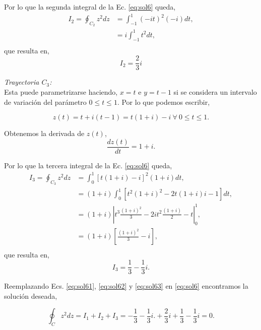 \documentclass[10pt,a4paper]{article}
\begin{document}
\begin{enumerate}
\begin{profesor}
	Por lo que la segunda integral de la Ec. \ref{eq:sol6} queda,
	\begin{equation}
	\begin{split}
	I_2=\oint_{C_2}z^2dz & = \int_{-1}^{1} (-it)^2(-i)dt,\\
	 & = i\int_{-1}^{1}t^2dt,\\
	\end{split}
	\end{equation}	
	que resulta en,
	\begin{equation}
	I_2=\frac{2}{3}i
	\end{equation}

	\textit{Trayectoria $C_3$:}\\
	Esta puede parametrizarse haciendo, $x=t$ e $y=t-1$ si se considera un 
	intervalo de variaci\'on del par\'ametro $0\leq t \leq 1$. Por lo que 
	podemos escribir,

	\begin{equation}
	z(t)=t+i(t-1)=t(1+i)-i~ \forall ~ 0 \leq t \leq 1.
	\end{equation}
	
	Obtenemos la derivada de $z(t)$,
	\begin{equation}
	\dfrac{dz(t)}{dt} = 1+i.
	\label{eq:sol62}
	\end{equation}
	
	Por lo que la tercera integral de la Ec. \ref{eq:sol6} queda,
	\begin{equation}
	\begin{split}
	I_3=\oint_{C_3}z^2dz & = \int_{0}^{1} [t(1+i)-i]^2 (1+i)dt,\\
	& =  (1+i) \int_{0}^{1}[t^2(1+i)^2-2t(1+i)i-1]dt,\\
	& = (1+i) \left| t^3 \frac{(1+i)^2}{3}-2it^2\frac{(1+i)}{2}-t \right|_0^1,\\
	& = (1+i) \left[\frac{(1+i)^2}{3}-i\right],\\
	\end{split}
	\end{equation}	
	que resulta en,
	\begin{equation}
	I_3=\frac{1}{3}	-\frac{1}{3}i.
	\label{eq:sol63}	
	\end{equation}

Reemplazando Ecs. \ref{eq:sol61}, \ref{eq:sol62} y \ref{eq:sol63} en 
\ref{eq:sol6} encontramos la soluci\'on deseada,

	\begin{equation}
	\oint_{C}z^2dz=I_1+I_2+I_3=-\frac{1}{3}	-\frac{1}{3}i. + \frac{2}{3}i + 
	\frac{1}{3}	-\frac{1}{3}i=0.	
	\end{equation}
\end{profesor}


\end{enumerate}
\end{document}
